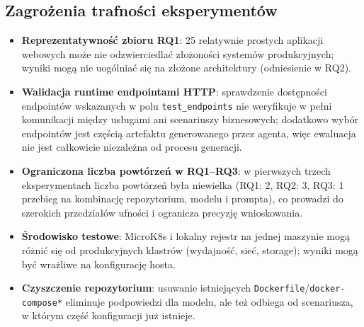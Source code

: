 \subsection{Zagrożenia trafności eksperymentów}
\label{sec:threats-to-validity}
\begin{itemize}
    \item \textbf{Reprezentatywność zbioru RQ1}: 25 relatywnie prostych aplikacji webowych może nie odzwierciedlać złożoności systemów produkcyjnych; wyniki mogą nie uogólniać się na złożone architektury (odniesienie w RQ2).
    \item \textbf{Walidacja runtime endpointami HTTP}: sprawdzenie dostępności endpointów wskazanych w polu \texttt{test\_endpoints} nie weryfikuje w pełni komunikacji między usługami ani scenariuszy biznesowych; dodatkowo wybór endpointów jest częścią artefaktu generowanego przez agenta, więc ewaluacja nie jest całkowicie niezależna od procesu generacji.
    \item \textbf{Ograniczona liczba powtórzeń w RQ1--RQ3}: w pierwszych trzech eksperymentach liczba powtórzeń była niewielka (RQ1: 2, RQ2: 3, RQ3: 1 przebieg na kombinację repozytorium, modelu i prompta), co prowadzi do szerokich przedziałów ufności i ogranicza precyzję wnioskowania.
    \item \textbf{Środowisko testowe}: MicroK8s i lokalny rejestr na jednej maszynie mogą różnić się od produkcyjnych klastrów (wydajność, sieć, storage); wyniki mogą być wrażliwe na konfigurację hosta.
    \item \textbf{Czyszczenie repozytorium}: usuwanie istniejących \texttt{Dockerfile}/\texttt{docker-compose*} eliminuje podpowiedzi dla modelu, ale też odbiega od scenariusza, w którym część konfiguracji już istnieje.
\end{itemize}
